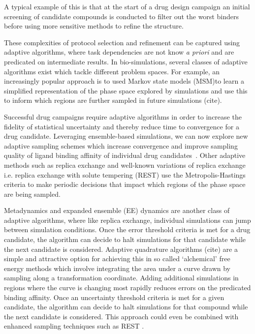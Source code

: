 A typical example of this is that at the start of a drug design campaign
an initial screening of candidate compounds is conducted to filter out the worst 
binders before using more sensitive methods to refine the structure.

These complexities of protocol selection and refinement can be captured using 
adaptive algorithms, where task  dependencies are not know 
\textit{a priori} and are predicated on intermediate results. 
In bio-simulations, several classes of adaptive algorithms exist which tackle 
different problem spaces. 
For example, an increasingly popular approach is to used Markov state models 
(MSM)to learn a simplified representation of the phase space explored by 
simulations and use this to inform which regions are further sampled in 
future simulations (cite). 

Successful drug campaigns require adaptive algorithms in order to increase 
the fidelity of statistical uncertainty and thereby reduce time to convergence 
for a drug candidate. Leveraging ensemble-based simulations, we can now explore 
new adaptive sampling schemes which increase convergence and improve 
sampling quality of ligand binding affinity of individual drug 
candidates~\cite{DeFabritiis2014}. Other adaptive methods such as replica 
exchange and well-known variations of replica exchange i.e. replica exchange 
with solute tempering (REST) use the Metropolis-Hastings criteria to make 
periodic decisions that impact which regions of the phase space are being 
sampled.

Metadynamics and expanded ensemble (EE) dynamics are another class of 
adaptive algorithms, where like replica exchange, individual simulations 
can jump between simulation conditions. Once the error threshold 
criteria is met for a drug candidate, the algorithm can decide to halt 
simulations for that candidate while the next candidate is considered. 
Adaptive quadrature algorithms (cite) are a simple and attractive option for 
achieving this in so called `alchemical' free energy methods which involve 
integrating the area under a curve drawn by sampling along a transformation 
coordinate. Adding additional simulations in regions where the curve is 
changing most rapidly reduces errors on the predicated binding affinity. 
Once an uncertainty threshold criteria is met for a given candidate, the 
algorithm can decide to halt simulations for that compound while the next 
candidate is considered. This approach could even be combined with enhanced 
sampling techniques such as REST .

